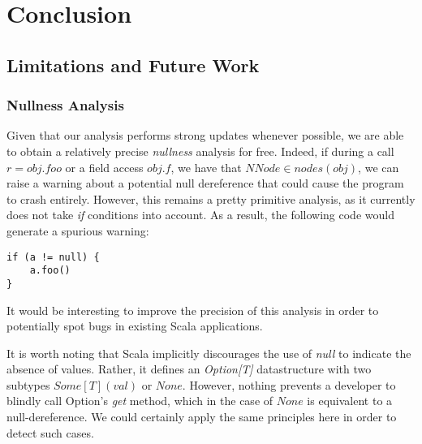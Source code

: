 \chapter{Conclusion}
\label{chap:conclusion}

\section{Limitations and Future Work}

\subsection{Nullness Analysis}
Given that our analysis performs strong updates whenever possible, we are able
to obtain a relatively precise \emph{nullness} analysis for free. Indeed, if during
a call $r = obj.foo$ or a field access $obj.f$, we have that $NNode \in
nodes(obj)$, we can raise a warning about a potential null dereference that
could cause the program to crash entirely. However, this remains a pretty
primitive analysis, as it currently does not take \emph{if} conditions into
account. As a result, the following code would generate a spurious warning:
\begin{lstlisting}
if (a != null) {
    a.foo()
}
\end{lstlisting}
It would be interesting to improve the precision of this analysis in order to
potentially spot bugs in existing Scala applications.

It is worth noting that Scala implicitly discourages the use of \emph{null} to
indicate the absence of values. Rather, it defines an \emph{Option[T]}
datastructure with two subtypes $Some[T](val)$ or $None$. However,
nothing prevents a developer to blindly call Option's \emph{get} method, which
in the case of $None$ is equivalent to a null-dereference. We could certainly
apply the same principles here in order to detect such cases.

